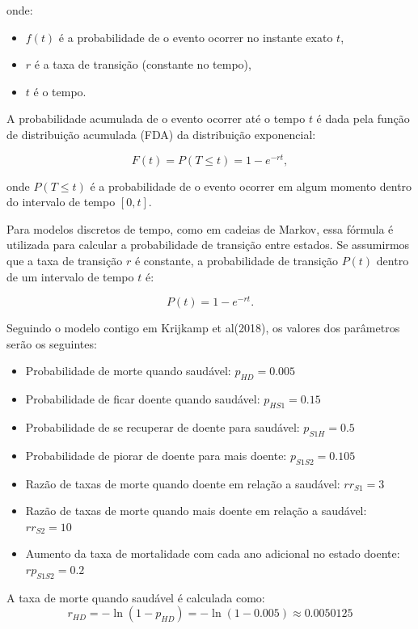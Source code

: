 \documentclass[12pt, a4paper, openany]{book}
\numberwithin{equation}{chapter}
\numberwithin{table}{chapter}
\numberwithin{figure}{chapter}
\theoremstyle{break}
\begin{document}
onde:
\begin{itemize}
    \item \( f(t) \) é a probabilidade de o evento ocorrer no instante exato \( t \),
    \item \( r \) é a taxa de transição (constante no tempo),
    \item \( t \) é o tempo.
\end{itemize}

A probabilidade acumulada de o evento ocorrer até o tempo \( t \) é dada pela função de distribuição acumulada (FDA) da distribuição exponencial:

\[
F(t) = P(T \leq t) = 1 - e^{-r t},
\]

onde \( P(T \leq t) \) é a probabilidade de o evento ocorrer em algum momento dentro do intervalo de tempo \( [0, t] \).

Para modelos discretos de tempo, como em cadeias de Markov, essa fórmula é utilizada para calcular a probabilidade de transição entre estados. Se assumirmos que a taxa de transição \( r \) é constante, a probabilidade de transição \( P(t) \) dentro de um intervalo de tempo \( t \) é:

\[
P(t) = 1 - e^{-r t}.
\]





Seguindo o modelo contigo em  Krijkamp et al(2018), os valores dos parâmetros serão os seguintes:
\begin{itemize}
    \item Probabilidade de morte quando saudável: \(p_{HD} = 0.005\)
    \item Probabilidade de ficar doente quando saudável: \(p_{HS1} = 0.15\)
    \item Probabilidade de se recuperar de doente para saudável: \(p_{S1H} = 0.5\)
    \item Probabilidade de piorar de doente para mais doente: \(p_{S1S2} = 0.105\)
    \item Razão de taxas de morte quando doente em relação a saudável: \(rr_{S1} = 3\)
    \item Razão de taxas de morte quando mais doente em relação a saudável: \(rr_{S2} = 10\)
    \item Aumento da taxa de mortalidade com cada ano adicional no estado doente: \(rp_{S1S2} = 0.2\)
\end{itemize}

A taxa de morte quando saudável é calculada como:
\[
r_{HD} = -\ln(1 - p_{HD}) = -\ln(1 - 0.005) \approx 0.0050125
\]
\end{document}
